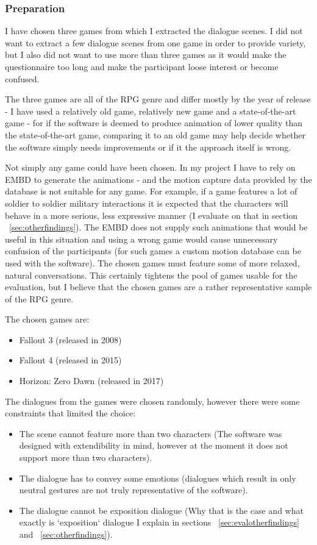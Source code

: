 \medskip
\subsubsection{Preparation}
I have chosen three games from which I extracted the dialogue scenes. I did not want to extract a few dialogue scenes from one game in order to provide variety, but I also did not want to use more than three games as it would make the questionnaire too long and make the participant loose interest or become confused.

The three games are all of the RPG genre and differ mostly by the year of release - I have used a relatively old game, relatively new game and a state-of-the-art game - for if the software is deemed to produce animation of lower quality than the state-of-the-art game, comparing it to an old game may help decide whether the software simply needs improvements or if it the approach itself is wrong.

Not simply any game could have been chosen. In my project I have to rely on EMBD to generate the animations - and the motion capture data provided by the database is not suitable for any game. For example, if a game features a lot of soldier to soldier military interactions it is expected that the characters will behave in a more serious, less expressive manner (I evaluate on that in section ~\ref{sec:otherfindings}). The EMBD does not supply such animations that would be useful in this situation and using a wrong game would cause unnecessary confusion of the participants (for such games a custom motion database can be used with the software). The chosen games must feature some of more relaxed, natural conversations. This certainly tightens the pool of games usable for the evaluation, but I believe that the chosen games are a rather representative sample of the RPG genre.

The chosen games are:
\begin{itemize}
	\item Fallout 3 (released in 2008)
	\item Fallout 4 (released in 2015)
	\item Horizon: Zero Dawn (released in 2017)
\end{itemize}

The dialogues from the games were chosen randomly, however there were some constraints that limited the choice:
\begin{itemize}
	\item The scene cannot feature more than two characters (The software was designed with extendibility in mind, however at the moment it does not support more than two characters).
	\item The dialogue has to convey some emotions (dialogues which result in only neutral gestures are not truly representative of the software).
	\item The dialogue cannot be exposition dialogue (Why that is the case and what exactly is `exposition` dialogue I explain in sections ~\ref{sec:evalotherfindings} and ~\ref{sec:otherfindings}).
\end{itemize}

